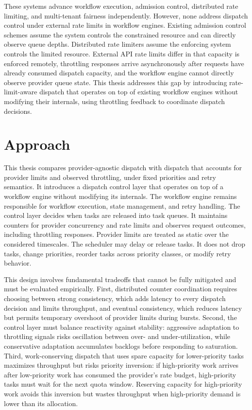 \documentclass{article}
\begin{document}
These systems advance workflow execution, admission control, distributed rate limiting, and multi-tenant fairness independently. However, none address dispatch control under external rate limits in workflow engines. Existing admission control schemes assume the system controls the constrained resource and can directly observe queue depths. Distributed rate limiters assume the enforcing system controls the limited resource. External API rate limits differ in that capacity is enforced remotely, throttling responses arrive asynchronously after requests have already consumed dispatch capacity, and the workflow engine cannot directly observe provider queue state. This thesis addresses this gap by introducing rate-limit-aware dispatch that operates on top of existing workflow engines without modifying their internals, using throttling feedback to coordinate dispatch decisions.

\section*{Approach}

This thesis compares provider-agnostic dispatch with dispatch that accounts for provider limits and observed throttling, under fixed priorities and retry semantics. It introduces a dispatch control layer that operates on top of a workflow engine without modifying its internals. The workflow engine remains responsible for workflow execution, state management, and retry handling. The control layer decides when tasks are released into task queues. It maintains counters for provider concurrency and rate limits and observes request outcomes, including throttling responses. Provider limits are treated as static over the considered timescales. The scheduler may delay or release tasks. It does not drop tasks, change priorities, reorder tasks across priority classes, or modify retry behavior.

This design involves fundamental tradeoffs that cannot be fully mitigated and must be evaluated empirically. First, distributed counter coordination requires choosing between strong consistency, which adds latency to every dispatch decision and limits throughput, and eventual consistency, which reduces latency but permits temporary overshoot of provider limits during bursts. Second, the control layer must balance reactivity against stability: aggressive adaptation to throttling signals risks oscillation between over- and under-utilization, while conservative adaptation accumulates backlogs before responding to saturation. Third, work-conserving dispatch that uses spare capacity for lower-priority tasks maximizes throughput but risks priority inversion: if high-priority work arrives after low-priority work has consumed the provider's rate budget, high-priority tasks must wait for the next quota window. Reserving capacity for high-priority work avoids this inversion but wastes throughput when high-priority demand is lower than its allocation.
\end{document}
